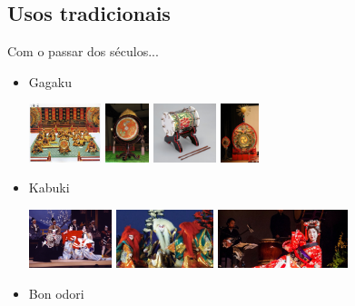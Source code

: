 \documentclass{beamer}
\begin{document}
\subsection{Usos tradicionais}
\begin{frame}{Com o passar dos séculos...}
    \pause
    \begin{itemize}
        \item Gagaku

            \includegraphics[height=1.7cm]{gagaku-1}
            \includegraphics[height=1.7cm]{gagaku-2}
            \includegraphics[height=1.7cm]{gagaku-3}
            \includegraphics[height=1.7cm]{gagaku-4}
            \pause
        \item Kabuki

            \includegraphics[height=1.7cm]{kabuki-1}
            \includegraphics[height=1.7cm]{kabuki-2}
            \includegraphics[height=1.7cm]{kabuki-3} 
            \pause
        \item Bon odori
            

\end{itemize}
\end{frame}
\end{document}
